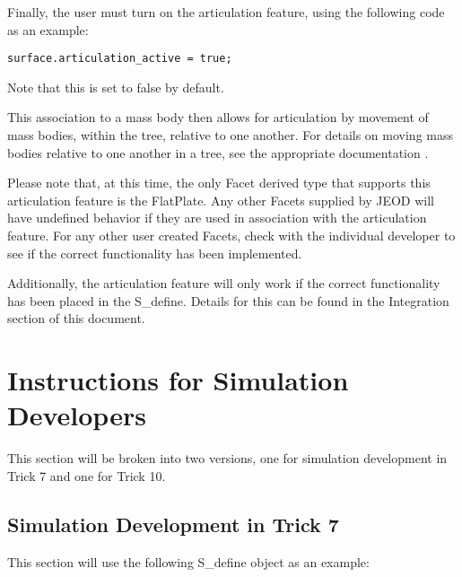 Finally, the user must turn on the articulation feature, using the
following code as an example:

\begin{verbatim}
surface.articulation_active = true;
\end{verbatim}

Note that this is set to false by default.

This association to a mass body then allows for articulation by movement of
mass bodies, within the tree, relative to one another. For details on
moving mass bodies relative to one another in a tree, see the appropriate
documentation \cite{dynenv:MASS}.

Please note that, at this time, the only Facet derived type that supports this articulation
feature is the FlatPlate. Any other Facets supplied by JEOD will have undefined behavior
if they are used in association with the articulation feature. For any other user created
Facets, check with the individual developer to see if the correct functionality has been implemented.

Additionally, the articulation feature will only work if the correct functionality has been
placed in the S\_define. Details for this can be found in the Integration section of this document.

\section{Instructions for Simulation Developers}

This section will be broken into two versions, one for simulation development in Trick 7 and
one for Trick 10.

\subsection{Simulation Development in Trick 7}

This section will use the following S\_define object as an example:

